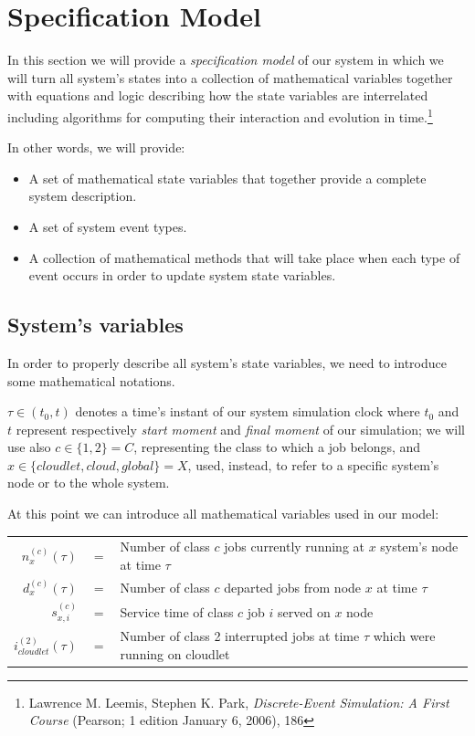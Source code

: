 \documentclass[10pt,a4paper]{article}
\begin{document}
\clearpage
\newpage
\section{Specification  Model}

In this section we will provide a \textit{specification model} of our system in which we will turn all system's states into a collection of mathematical variables together with equations and logic describing how the state variables are interrelated including algorithms for computing their interaction and evolution in time.\footnote{Lawrence M. Leemis, Stephen K. Park, \textit{Discrete-Event Simulation: A First Course} (Pearson; 1 edition January 6, 2006), 186}

In other words, we will provide:

\begin{itemize}
\item A set of mathematical state variables that together provide a complete system description.
\item A set of system event types.
\item A collection of mathematical methods that will take place when each type of event occurs in order to update system state variables.
\end{itemize}

\subsection{System's variables}

In order to properly describe all system's state variables, we need to introduce some mathematical notations.

$\tau \in (t_0, t)$ denotes a time's instant of our system simulation clock where $t_0$ and $t$ represent respectively \textit{start moment} and \textit{final moment} of our simulation; we will use also $c \in \lbrace 1,2 \rbrace = C$, representing the class to which a job belongs, and $x \in \lbrace cloudlet,cloud,global \rbrace = X$, used, instead, to refer to a specific system's node or to the whole system.

At this point we can introduce all mathematical variables used in our model:

\begin{table}[h!]
    \centering
    \small
    \begin{tabular}{rcl}
       
      $n_x^{(c)}(\tau)$ & $ = $ & Number of class $c$ jobs currently running at $x$ system's node at time $\tau$ \\
      $d_x^{(c)}(\tau)$ & $ = $ & Number of class $c$ departed jobs from node $x$ at time $\tau$ \\
      $s_{x,i}^{(c)}$ & $ = $ & Service time of class $c$ job $i$ served on $x$ node   \\
      $i_{cloudlet}^{(2)}(\tau)$ & $ = $ & Number of class 2 interrupted jobs at time $\tau$ which were running on cloudlet\\
          
    \end{tabular}
\end{table}
\end{document}
